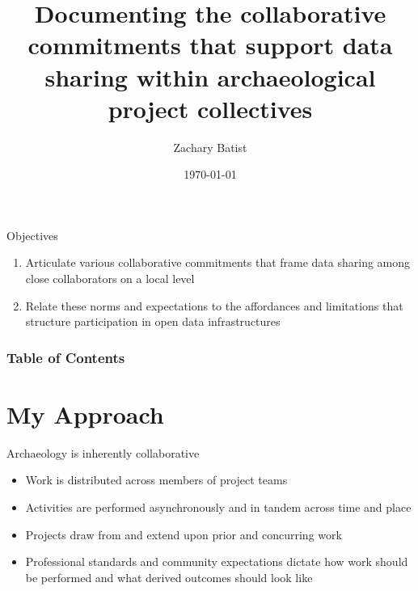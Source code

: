 \documentclass{beamer}
\title{Documenting the collaborative commitments that support data sharing within archaeological project collectives}
\date{\today}
\author{Zachary Batist}
\institute{Faculty of Information\\University of Toronto}
\begin{document}
\maketitle

\begin{frame}{Objectives}
  \begin{enumerate}
    \item Articulate various collaborative commitments that frame data sharing among close collaborators on a local level
    \item Relate these norms and expectations to the affordances and limitations that structure participation in open data infrastructures

  \end{enumerate}
  
\end{frame}

\begin{frame}
  \frametitle{Table of Contents}
  \tableofcontents
\end{frame}

\section{My Approach}

\begin{frame}{Archaeology is inherently collaborative}
  \begin{itemize}
    \item Work is distributed across members of project teams
    \item Activities are performed asynchronously and in tandem across time and place
    \item Projects draw from and extend upon prior and concurring work
    \item Professional standards and community expectations dictate how work should be performed and what derived outcomes should look like
  \end{itemize}
\end{frame}
\end{document}
